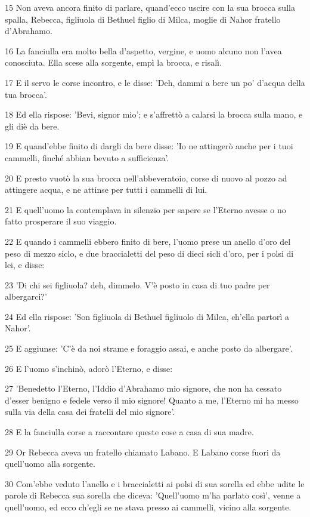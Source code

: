 \par 15 Non aveva ancora finito di parlare, quand'ecco uscire con la sua brocca sulla spalla, Rebecca, figliuola di Bethuel figlio di Milca, moglie di Nahor fratello d'Abrahamo.
\par 16 La fanciulla era molto bella d'aspetto, vergine, e uomo alcuno non l'avea conosciuta. Ella scese alla sorgente, empì la brocca, e risalì.
\par 17 E il servo le corse incontro, e le disse: 'Deh, dammi a bere un po' d'acqua della tua brocca'.
\par 18 Ed ella rispose: 'Bevi, signor mio'; e s'affrettò a calarsi la brocca sulla mano, e gli diè da bere.
\par 19 E quand'ebbe finito di dargli da bere disse: 'Io ne attingerò anche per i tuoi cammelli, finché abbian bevuto a sufficienza'.
\par 20 E presto vuotò la sua brocca nell'abbeveratoio, corse di nuovo al pozzo ad attingere acqua, e ne attinse per tutti i cammelli di lui.
\par 21 E quell'uomo la contemplava in silenzio per sapere se l'Eterno avesse o no fatto prosperare il suo viaggio.
\par 22 E quando i cammelli ebbero finito di bere, l'uomo prese un anello d'oro del peso di mezzo siclo, e due braccialetti del peso di dieci sicli d'oro, per i polsi di lei, e disse:
\par 23 'Di chi sei figliuola? deh, dimmelo. V'è posto in casa di tuo padre per albergarci?'
\par 24 Ed ella rispose: 'Son figliuola di Bethuel figliuolo di Milca, ch'ella partorì a Nahor'.
\par 25 E aggiunse: 'C'è da noi strame e foraggio assai, e anche posto da albergare'.
\par 26 E l'uomo s'inchinò, adorò l'Eterno, e disse:
\par 27 'Benedetto l'Eterno, l'Iddio d'Abrahamo mio signore, che non ha cessato d'esser benigno e fedele verso il mio signore! Quanto a me, l'Eterno mi ha messo sulla via della casa dei fratelli del mio signore'.
\par 28 E la fanciulla corse a raccontare queste cose a casa di sua madre.
\par 29 Or Rebecca aveva un fratello chiamato Labano. E Labano corse fuori da quell'uomo alla sorgente.
\par 30 Com'ebbe veduto l'anello e i braccialetti ai polsi di sua sorella ed ebbe udite le parole di Rebecca sua sorella che diceva: 'Quell'uomo m'ha parlato così', venne a quell'uomo, ed ecco ch'egli se ne stava presso ai cammelli, vicino alla sorgente.
